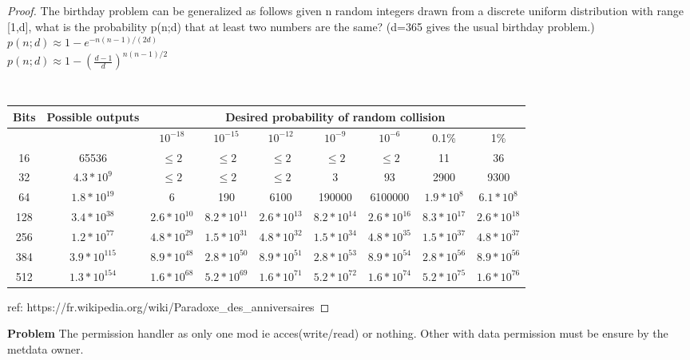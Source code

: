 \begin{proof}
The birthday problem can be generalized as follows given n random integers drawn from a 
discrete uniform distribution with range [1,d], what is the probability p(n;d) that at 
least two numbers are the same? (d=365 gives the usual birthday problem.)\\
   $p(n;d)\approx 1-e^{-n(n-1)/(2d)}$\\
   $p(n;d)\approx 1-\left({\frac {d-1}{d}}\right)^{n(n-1)/2}$\\\\
   \begin{table}[h]
      \centering
      \begin{tabular}{|c|c|c|c|c|c|c|c|c|}
	\hline
	Bits & Possible outputs &  \multicolumn{7}{c|}{Desired probability of random collision} \\
	\hline
	    & & $10^{-18}$ & $10^{-15}$ & $10^{-12}$ & $10^{-9}$ & $10^{-6}$ & 0.1\% & 1\% \\
	\hline
	16 & 65536  & $\le2$& $\le2$& $\le2$& $\le2$& $\le2$& 11 & 36  \\
	32 & $4.3*10^{9}$ & $\le2$& $\le2$& $\le2$& 3 & 93 & 2900 & 9300 \\
	64 & $1.8*10^{19}$ & 6 & 190 & 6100 & 190000 & 6100000 & $1.9*10^{8}$ & $6.1*10^{8}$ \\
	128 & $3.4*10^{38}$ & $2.6*10^{10}$ & $8.2*10^{11}$ & $2.6*10^{13}$ & $8.2*10^{14}$ & $2.6*10^{16}$ & $8.3*10^{17}$ & $2.6*10^{18}$\\
	256 & $1.2*10^{77}$ & $4.8*10^{29}$ & $1.5*10^{31}$ & $4.8*10^{32}$ & $1.5*10^{34}$ & $4.8*10^{35}$ & $1.5*10^{37}$ & $4.8*10^{37}$\\
	384 & $3.9*10^{115}$ & $8.9*10^{48}$ & $2.8*10^{50}$ & $8.9*10^{51}$ & $2.8*10^{53}$ & $8.9*10^{54}$ & $2.8*10^{56}$ & $8.9*10^{56}$\\
	512 & $1.3*10^{154}$ & $1.6*10^{68}$ & $5.2*10^{69}$ & $1.6*10^{71}$ & $5.2*10^{72}$ & $1.6*10^{74}$ & $5.2*10^{75}$ & $1.6*10^{76}$\\
	\hline
    \end{tabular}
    \caption{}
   \end{table}
   
ref:    https://fr.wikipedia.org/wiki/Paradoxe\_des\_anniversaires
  
\end{proof}


\textbf{Problem}
The permission handler as only one mod ie acces(write/read) or nothing. Other with data permission must be ensure by the 
metdata owner.